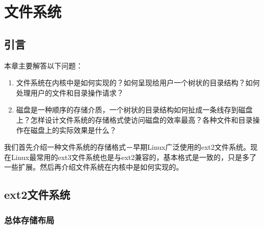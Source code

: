 

\chapter{文件系统}
%





\section{引言}
%
本章主要解答以下问题：


\begin{enumerate}

\item 文件系统在内核中是如何实现的？如何呈现给用户一个树状的目录结构？如何处理用户的文件和目录操作请求？

\item 磁盘是一种顺序的存储介质，一个树状的目录结构如何扯成一条线存到磁盘上？怎样设计文件系统的存储格式使访问磁盘的效率最高？各种文件和目录操作在磁盘上的实际效果是什么？
\end{enumerate}



我们首先介绍一种文件系统的存储格式－早期Linux广泛使用的ext2文件系统。现在Linux最常用的ext3文件系统也是与ext2兼容的，基本格式是一致的，只是多了一些扩展。然后再介绍文件系统在内核中是如何实现的。




\section{ext2文件系统}
%
\subsection{总体存储布局}
%


